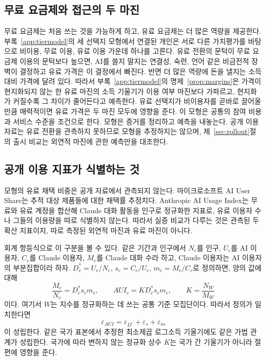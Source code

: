 \documentclass[11pt]{article}
\theoremstyle{definition}
\theoremstyle{remark}
\begin{document}
\subsection{무료 요금제와 접근의 두 마진}\label{sec:mechanism}

무료 요금제는 처음 쓰는 것을 가능하게 하고, 유료 요금제는 더 많은 역량을 제공한다. 부록~\ref{app:tiermodel}의 세 선택지 모형에서 연결된 개인은 서로 다른 가치평가를 바탕으로 비이용, 무료 이용, 유료 이용 가운데 하나를 고른다. 유료 전환의 문턱이 무료 요금제 이용의 문턱보다 높으면, AI를 쓸지 말지는 연결성, 숙련, 언어 같은 비금전적 장벽이 결정하고 유료 가격은 이 결정에서 빠진다. 반면 더 많은 역량에 돈을 낼지는 소득 대비 가격에 달려 있다. 따라서 부록~\ref{app:tiermodel}의 명제~\ref{prop:margins}은 가격이 현지화되지 않는 한 유료 마진의 소득 기울기가 이용 여부 마진보다 가파르고, 현지화가 커질수록 그 차이가 줄어든다고 예측한다. 유료 선택지가 비이용자를 곧바로 끌어올 만큼 매력적이면 유료 가격은 두 마진 모두에 영향을 준다. 이 모형은 공통의 참여 비용과 서비스 수준을 조건으로 한다. 모형은 증거를 정리하고 예측을 내놓는다. 공개 이용 자료는 유료 전환을 관측하지 못하므로 모형을 추정하지는 않으며, 제~\ref{sec:rollout}절의 출시 비교는 외연적 마진에 관한 예측만을 대조한다.

\subsection{공개 이용 지표가 식별하는 것}
\label{sec:usage_measurement}

모형의 유료 채택 비중은 공개 자료에서 관측되지 않는다. 마이크로소프트 AI User Share는 추적 대상 제품들에 대한 채택률 추정치다. Anthropic AI Usage Index는 무료와 유료 계정을 합산해 Claude 대화 활동을 인구로 정규화한 지표로, 유료 이용자 수나 그들의 이용량을 따로 식별하지 않는다. 따라서 실증 비교가 다루는 것은 관측된 두 확산 지표이지, 따로 측정된 외연적 마진과 유료 마진이 아니다.

회계 항등식으로 이 구분을 볼 수 있다. 같은 기간과 인구에서 $N_c$를 인구, $U_c$를 AI 이용자,
$C_c$를 Claude 이용자, $M_c$를 Claude 대화 수라 하고, Claude 이용자는 AI 이용자의
부분집합이라 하자. $D_c^*=U_c/N_c$, $s_c=C_c/U_c$, $m_c=M_c/C_c$로 정의하면,
양의 값에 대해
\begin{equation}
 \frac{M_c}{N_c}=D_c^*s_cm_c,\qquad
 AUI_c=K D_c^*s_cm_c,\qquad K=\frac{N_W}{M_W}
 \label{eq:aui_identity}
\end{equation}
이다. 여기서 $W$는 지수를 정규화하는 데 쓰는 공통 기준 모집단이다.
따라서 정의가 일치한다면
\begin{equation}
 \varepsilon_{AUI}=\varepsilon_{D^*}+\varepsilon_s+\varepsilon_m
 \label{eq:aui_elasticity_decomposition}
\end{equation}
이 성립한다. 같은 국가 표본에서 추정한 최소제곱 로그소득 기울기에도
같은 가법 관계가 성립한다. 국가에 따라 변하지 않는 정규화 상수
$K$는 국가 간 기울기가 아니라 절편에 영향을 준다.
\end{document}
